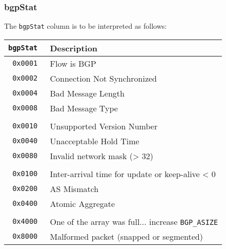 \documentclass[documentation]{subfiles}
\begin{document}
\subsubsection{bgpStat}\label{bgpStat}
The {\tt bgpStat} column is to be interpreted as follows:
\begin{longtable}{>{\tt}rl}
    \toprule
    {\bf bgpStat} & {\bf Description}\\
    \midrule\endhead%
    0x0001 & Flow is BGP\\
    0x0002 & Connection Not Synchronized\\
    0x0004 & Bad Message Length\\
    0x0008 & Bad Message Type\\
    \\
    0x0010 & Unsupported Version Number\\
    0x0040 & Unacceptable Hold Time\\
    0x0080 & Invalid network mask (> 32)\\
    \\
    0x0100 & Inter-arrival time for update or keep-alive < 0\\
    0x0200 & AS Mismatch\\
    0x0400 & Atomic Aggregate\\
    \\
    0x4000 & One of the array was full... increase {\tt BGP\_ASIZE}\\
    0x8000 & Malformed packet (snapped or segmented)\\
    \bottomrule
\end{longtable}
\end{document}
